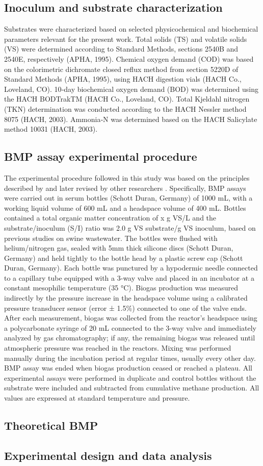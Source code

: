 \subsection{Inoculum and substrate characterization}
Substrates were characterized based on selected physicochemical and biochemical parameters relevant for the present work. Total solids (TS) and volatile solids (VS) were determined according to Standard Methods, sections 2540B and 2540E, respectively (APHA, 1995). Chemical oxygen demand (COD) was based on the colorimetric dichromate closed reflux method from section 5220D of Standard Methods (APHA, 1995), using HACH digestion vials (HACH Co., Loveland, CO). 10‐day biochemical oxygen demand (BOD) was determined using the HACH BODTrakTM (HACH Co., Loveland, CO). Total Kjeldahl nitrogen (TKN) determination was conducted according to the HACH Nessler method 8075 (HACH, 2003). Ammonia‐N was determined based on the HACH Salicylate method 10031 (HACH, 2003). 
\subsection{BMP assay experimental procedure}
The experimental procedure followed in this study was based on the principles described by \cite{Owen_1979} and later revised by other researchers \cite{Angelidaki_2009,Holliger_2016}. Specifically, BMP assays were carried out in serum bottles (Schott Duran, Germany) of 1000 mL, with a working liquid volume of 600 mL and a headspace volume of 400 mL. Bottles contained a total organic matter concentration of x g VS/L and the substrate/inoculum (S/I) ratio was 2.0 g VS substrate/g VS inoculum, based on previous studies on swine wastewater. The bottles were flushed with helium/nitrogen gas, sealed with 5mm thick silicone discs (Schott Duran, Germany) and held tightly to the bottle head by a plastic screw cap (Schott Duran, Germany). Each bottle was punctured by a hypodermic needle connected to a capillary tube equipped with a 3-way valve and placed in an incubator at a constant mesophilic temperature (35 °C). Biogas production was measured indirectly by the pressure increase in the headspace volume using a calibrated pressure transducer sensor (error ± 1.5\%) connected to one of the valve ends. After each measurement, biogas was collected from the reactor's headspace using a polycarbonate syringe of 20 mL connected to the 3-way valve and immediately analyzed by gas chromatography; if any, the remaining biogas was released until atmospheric pressure was reached in the reactors. Mixing was performed manually during the incubation period at regular times, usually every other day. BMP assay was ended when biogas production ceased or reached a plateau. All experimental assays were performed in duplicate and control bottles without the substrate were included and subtracted from cumulative methane production.  All values are expressed at standard temperature and pressure.
\subsection{Theoretical BMP}

\subsection{Experimental design and data analysis}


